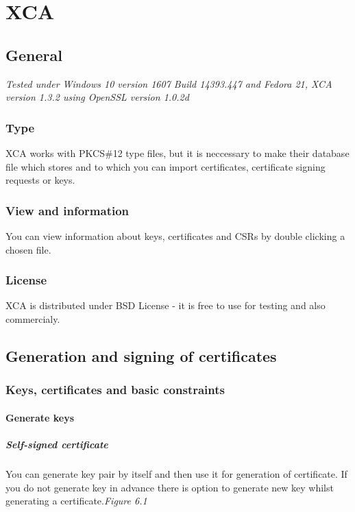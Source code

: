 \documentclass[10pt, a4paper]{report}
\begin{document}
\chapter{XCA}

\section{General}

\textit{Tested under Windows 10 version 1607 Build 14393.447 and Fedora 21, XCA version 1.3.2 using OpenSSL version 1.0.2d}

  \subsection{Type}
XCA works with PKCS\#12 type files, but it is neccessary to make their database file which stores and to which you can import certificates, certificate signing requests or keys.
  \subsection{View and information}
You can view information about keys, certificates and CSRs by double clicking a chosen file.
  \subsection{License}
XCA is distributed under BSD License - it is free to use for testing and also commercialy.
  
\section{Generation and signing of certificates}

  \subsection{Keys, certificates and basic constraints}
  
    \subsubsection{Generate keys}
    
      \paragraph{Self-signed certificate}
You can generate key pair by itself and then use it for generation of certificate. If you do not generate key in advance there is option to generate new key whilst generating a certificate.\textit{{Figure 6.1}}  \\
\end{document}
